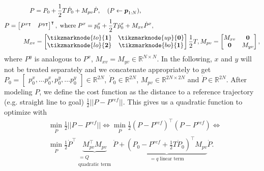 \documentclass[letterpaper,conference,10pt]{IEEEconf}
\begin{document}
\begin{align}
    \label{eq:dynamics_horizon}
    &\quad\quad\quad\quad P=P_0+\dfrac{1}{2}T\dot{P}_0+M_{pv}\dot{P}, \quad (P\leftarrow\boldsymbol{p}_{1:N}),\nonumber\\
    &P=\begin{bmatrix}P^{x\intercal} & P^{y\intercal}\end{bmatrix}^\intercal, \;\text{where} \;P^x=p^x_0+\dfrac{1}{2}T\dot{p}^x_0+M_{xv}\dot{P}^x,\nonumber\\
        &\quad\quad\quad M_{xv} = \begin{bmatrix} \tikzmarknode{to}{\boldsymbol{1}} &  \tikzmarknode{up}{\boldsymbol{0}} \\  \tikzmarknode{lo}{\boldsymbol{2}} &  \tikzmarknode{bo}{\boldsymbol{1}}\end{bmatrix}\dfrac{1}{2}T, M_{pv}=\begin{bmatrix}
            M_{xv} & \boldsymbol{0} \\
            \boldsymbol{0} & M_{yv} \\
        \end{bmatrix},
\end{align}
where $P^y$ is analogous to $P^x$, $M_{xv}=M_{yv}\in\mathbb{R}^{N\times N}$. In the following, $x$ and $y$ will not be treated separately and we concatenate appropriately to get $P_0=\begin{bmatrix}
    p^x_0, \dots p^x_0, p^y_0, \dots p^y_0
\end{bmatrix}\in\mathbb{R}^{2N}$, $\dot{P}_0\in\mathbb{R}^{2N}$, $M_{pv}\in\mathbb{R}^{2N\times 2N}$ and $\dot{P}\in\mathbb{R}^{2N}$. After modeling $P$, we define the cost function as the distance to a reference trajectory (e.g. straight line to goal) $\frac{1}{2}\vert\vert P - P^{ref}\vert\vert$. This gives us a quadratic function to optimize with 
\begin{align*}
    &\min\limits_{\dot{P}}\frac{1}{2}\vert\vert P - P^{ref}\vert\vert \Leftrightarrow \min\limits_{\dot{P}}\frac{1}{2}\left(P-P^{ref}\right)^\intercal\left(P-P^{ref}\right) \Leftrightarrow \nonumber\\
    &\min\limits_{\dot{P}} \frac{1}{2}\dot{P}^\intercal\underbrace{M_{pv}^\intercal M_{pv}}_{\substack{=Q \\ \text{quadratic term} }}\dot{P} +  \underbrace{\left(P_0-P^{ref}+ \frac{1}{2}T\dot{P}_0\right)^\intercal M_{pv}}_{=q \;\text{linear term}}\dot{P}.\nonumber
\end{align*}
\end{document}
